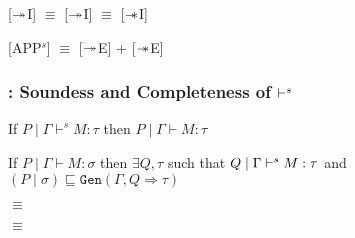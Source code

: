 \begin{frame}[c]
\begin{center}
        [$\twoheadrightarrow$I] $\equiv$ [$\twoheadrightarrow$I] \qquad [$\sepimp$I] $\equiv$ [$\sepimp$I]

        [APP$^s$] $\equiv$ [$\twoheadrightarrow$E] + [$\sepimp$E]
\end{center}
\end{frame}

\begin{frame}
  \frametitle{\qub{}: Soundess and Completeness of $\vdash^s$}
  \begin{center}
    \begin{theorem}
      If $P \mid \Gamma \vdash^s M:\tau$ then $P \mid \Gamma \vdash M : \tau$
    \end{theorem}

    \begin{theorem}
      If $P \mid \Gamma \vdash M:\sigma$ then
      $\exists Q, \tau$ such that $Q \mid \Gamma \vdash^s M:\tau$
      and $(P \mid \sigma) \sqsubseteq \texttt{Gen}(\Gamma, Q \Rightarrow \tau)$
    \end{theorem}

    {\small
       $\equiv$ 

       $\equiv$ 
    }

  \end{center}
\end{frame}


